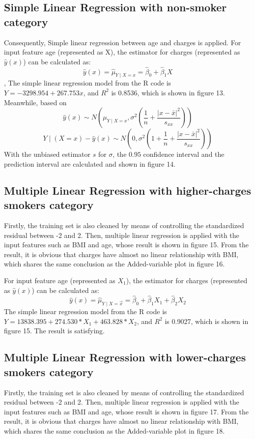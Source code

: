 \documentclass[12pt,a4paper]{article}
\begin{document}
\subsection{Simple Linear Regression with non-smoker category}
Consequently, Simple linear regression between age and charges is applied.
For input feature age (represented as X), the estimator for charges (represented as $\widehat{y}(x)$) can be calculated as:
$$\widehat{y}(x)=\widehat{\mu}_{Y \mid X=x}=\widehat{\beta}_{0}+\widehat{\beta}_{1} X $$,
The simple linear regression model from the R code is $Y = -3298.954 + 267.753x$, and $R^{2}$ is 0.8536, which is shown in figure 13.
Meanwhile, based on
$$\widehat{y}(x) \sim N\left(\mu_{Y \mid X=x}, \sigma^{2}\left(\frac{1}{n}+\frac{|x-\bar{x}|^{2}}{s_{x x}}\right)\right)$$
$$Y \mid(X=x)-\widehat{y}(x) \sim N\left(0, \sigma^{2}\left(1+\frac{1}{n}+\frac{|x-\bar{x}|^{2}}{s_{x x}}\right)\right)$$
With the unbiased estimator $s$ for $\sigma$, the  $0.95 $ confidence interval and the prediction interval are calculated and shown in figure 14.

\subsection{Multiple Linear Regression with higher-charges smokers category }
Firstly, the training set is also cleaned by means of controlling the standardized residual between -2 and 2.
Then, multiple linear regression is applied with the input features such as BMI and age, whose result is shown in figure 15. From the result, it is obvious that charges have almost no linear relationship with BMI, which shares the same conclusion as the Added-variable plot in figure 16. 

For input feature age (represented as $X_1$), the estimator for charges (represented as $\widehat{y}(x)$) can be calculated as:
$$\widehat{y}(x)=\widehat{\mu}_{Y \mid X=\vec{x} }=\widehat{\beta}_{0}+\widehat{\beta}_{1} X_1+ \widehat{\beta}_{2} X_2$$
The simple linear regression model from the R code is $Y = 13838.395 + 274.530 * X_1 + 463.828 * X_2$, and $R^{2}$ is  0.9027, which is shown in figure 15. The result is satisfying.
\subsection{Multiple Linear Regression with lower-charges smokers category}
Firstly, the training set is also cleaned by means of controlling the standardized residual between -2 and 2.
Then, multiple linear regression is applied with the input features such as BMI and age, whose result is shown in figure 17. From the result, it is obvious that charges have almost no linear relationship with BMI, which shares the same conclusion as the Added-variable plot in figure 18. 
\end{document}
